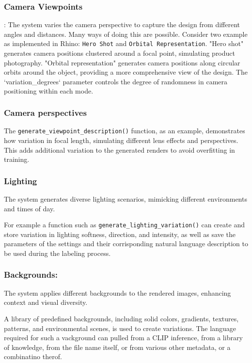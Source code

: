 \documentclass{article}
\begin{document}
\subsubsection{Camera Viewpoints}:  The system varies the camera perspective to capture the design from different angles and distances. Many ways of doing this are possible. Consider two example as implemented in Rhino: \texttt{Hero Shot} and \texttt{Orbital Representation}. "Hero shot" generates camera positions clustered around a focal point, simulating product photography. "Orbital representation" generates camera positions along circular orbits around the object, providing a more comprehensive view of the design. The `variation\_degrees` parameter controls the degree of randomness in camera positioning within each mode.

\subsubsection{Camera perspectives} 
The \texttt{generate\_viewpoint\_description()} function, as an example, demonstrates how variation in focal length, simulating different lens effects and perspectives. This adds additional variation to the generated renders to avoid overfitting in training.


\subsubsection{Lighting} The system generates diverse lighting scenarios, mimicking different environments and times of day.

For example a function such as \texttt{generate\_lighting\_variation()} can create and store variation in lighting softness, direction, and intensity, as well as save the parameters of the settings and their corrisponding natural language description to be used during the labeling process. 


\subsubsection{Backgrounds:} The system applies different backgrounds to the rendered images, enhancing context and visual diversity.

A library of predefined backgrounds, including solid colors, gradients, textures, patterns, and environmental scenes, is used to create variations. The language required for such a vackground can pulled from a CLIP inference, from a library of knowledge, from the file name itself, or from various other metadata, or a combinatino therof.
\end{document}
